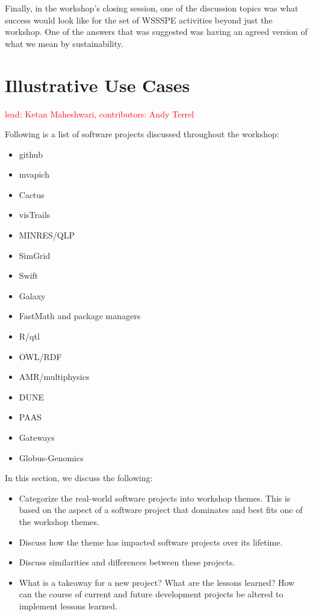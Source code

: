 \documentclass[11pt, oneside]{amsart}
\newcommand{\note}[1]{ {\textcolor{red}    { #1 }}}
\begin{document}
Finally, in the workshop's closing session, one of the discussion topics was 
what success would look like for the set of WSSSPE activities beyond just the workshop.
One of the answers that was suggested was
having an agreed version of what we mean by sustainability.


\section{Illustrative Use Cases} \label{sec:use-cases}

\note{lead: Ketan Maheshwari, contributors: Andy Terrel}

Following is a list of software projects discussed throughout the workshop:

\begin{itemize}
    \item github
    \item mvapich
    \item Cactus
    \item visTrails
    \item MINRES/QLP
    \item SimGrid
    \item Swift
    \item Galaxy
    \item FastMath and package managers
    \item R/qtl
    \item OWL/RDF
    \item AMR/multiphysics
    \item DUNE
    \item PAAS
    \item Gateways
    \item Globus-Genomics
\end{itemize}

In this section, we discuss the following:
\begin{itemize}
    \item Categorize the real-world software projects into workshop themes. This is based on the aspect of a software project that dominates and best fits one of the workshop themes.
    \item Discuss how the theme has impacted software projects over its lifetime.
    \item Discuss similarities and differences between these projects.
    \item What is a takeaway for a new project? What are the lessons learned? How can the course of current and future development projects be altered to implement lessons learned.
\end{itemize}
\end{document}
